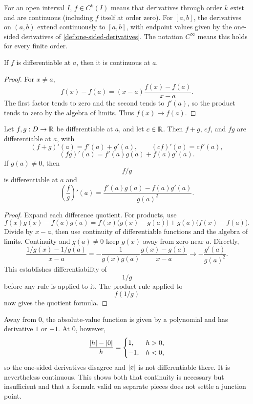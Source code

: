 \begin{definition}
\label{def:one-variable-ck}
For an open interval $I$, $f\in C^k(I)$ means that derivatives through
order $k$ exist and are continuous (including $f$ itself at order zero).
For $[a,b]$, the derivatives on $(a,b)$ extend continuously to $[a,b]$,
with endpoint values given by the one-sided derivatives of
\cref{def:one-sided-derivatives}. The notation $C^\infty$
means this holds for every finite order.
\end{definition}

\begin{theorem}
\label{thm:differentiability-continuity}
If $f$ is differentiable at $a$, then it is continuous at $a$.
\end{theorem}
\begin{proof}
For $x\ne a$,
\[
f(x)-f(a)=(x-a)\frac{f(x)-f(a)}{x-a}.
\]
The first factor tends to zero and the second tends to $f'(a)$, so the product tends to zero by the algebra of limits. Thus $f(x)\to f(a)$.
\end{proof}

\begin{theorem}
\label{thm:derivative-rules}
Let $f,g:D\to\mathbb{R}$ be differentiable at $a$, and let $c\in\mathbb{R}$. Then $f+g$, $cf$, and $fg$ are differentiable at $a$, with
\[
(f+g)'(a)=f'(a)+g'(a),\qquad(cf)'(a)=cf'(a),
\]
\[
(fg)'(a)=f'(a)g(a)+f(a)g'(a).
\]
If $g(a)\ne0$, then
\[
f/g
\]
 is differentiable at $a$ and
\[
\left(\frac fg\right)'(a)=\frac{f'(a)g(a)-f(a)g'(a)}{g(a)^2}.
\]
\end{theorem}
\begin{proof}
Expand each difference quotient. For products, use
\[
f(x)g(x)-f(a)g(a)=f(x)\bigl(g(x)-g(a)\bigr)+g(a)\bigl(f(x)-f(a)\bigr).
\]
Divide by $x-a$, then use continuity of differentiable functions and the algebra of limits. Continuity and $g(a)\ne0$ keep $g(x)$ away from zero near $a$. Directly,
\[
\frac{1/g(x)-1/g(a)}{x-a}
=-\frac1{g(x)g(a)}\frac{g(x)-g(a)}{x-a}
\longrightarrow-\frac{g'(a)}{g(a)^2}.
\]
This establishes differentiability of
\[
1/g
\]
 before any rule is applied to
it. The product rule applied to
\[
f(1/g)
\]
 now gives the quotient formula.
\end{proof}

\begin{example}
Away from $0$, the absolute-value function is given by a polynomial and has
derivative $1$ or $-1$.  At $0$, however,
\[
\frac{\lvert h\rvert-\lvert 0\rvert}{h}=
\begin{cases}1,&h>0,\\-1,&h<0,\end{cases}
\]
so the one-sided derivatives disagree and $\lvert x\rvert$ is not differentiable
there.  It is nevertheless continuous.  This shows both that continuity is
necessary but insufficient and that a formula valid on separate pieces
does not settle a junction point.
\end{example}


